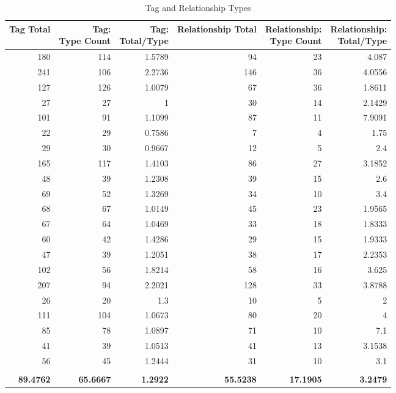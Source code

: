 \begin{table}[!htbp]
  \centering
  \caption{Tag and Relationship Types}\label{table:tag_relationship_types} 
    \begin{tabular}{rrrrrr}
    \toprule
    Tag Total & \specialcell[t]{Tag:\\Type Count} & \specialcell[t]{Tag:\\Total/Type} & Relationship Total & \specialcell[t]{Relationship:\\Type Count} & \specialcell[t]{Relationship:\\Total/Type} \\
    \midrule
    180   & 114   & 1.5789 & 94    & 23    & 4.087 \\
    241   & 106   & 2.2736 & 146   & 36    & 4.0556 \\
    127   & 126   & 1.0079 & 67    & 36    & 1.8611 \\
    27    & 27    & 1     & 30    & 14    & 2.1429 \\
    101   & 91    & 1.1099 & 87    & 11    & 7.9091 \\
    22    & 29    & 0.7586 & 7     & 4     & 1.75 \\
    29    & 30    & 0.9667 & 12    & 5     & 2.4 \\
    165   & 117   & 1.4103 & 86    & 27    & 3.1852 \\
    48    & 39    & 1.2308 & 39    & 15    & 2.6 \\
    69    & 52    & 1.3269 & 34    & 10    & 3.4 \\
    68    & 67    & 1.0149 & 45    & 23    & 1.9565 \\
    67    & 64    & 1.0469 & 33    & 18    & 1.8333 \\
    60    & 42    & 1.4286 & 29    & 15    & 1.9333 \\
    47    & 39    & 1.2051 & 38    & 17    & 2.2353 \\
    102   & 56    & 1.8214 & 58    & 16    & 3.625 \\
    207   & 94    & 2.2021 & 128   & 33    & 3.8788 \\
    26    & 20    & 1.3   & 10    & 5     & 2 \\
    111   & 104   & 1.0673 & 80    & 20    & 4 \\
    85    & 78    & 1.0897 & 71    & 10    & 7.1 \\
    41    & 39    & 1.0513 & 41    & 13    & 3.1538 \\
    56    & 45    & 1.2444 & 31    & 10    & 3.1 \\
          &       &       &       &       &  \\
    \textbf{89.4762} & \textbf{65.6667} & \textbf{1.2922} & \textbf{55.5238} & \textbf{17.1905} & \textbf{3.2479} \\
    \bottomrule
    \end{tabular}%
  \label{tab:addlabel}%
\end{table}%

